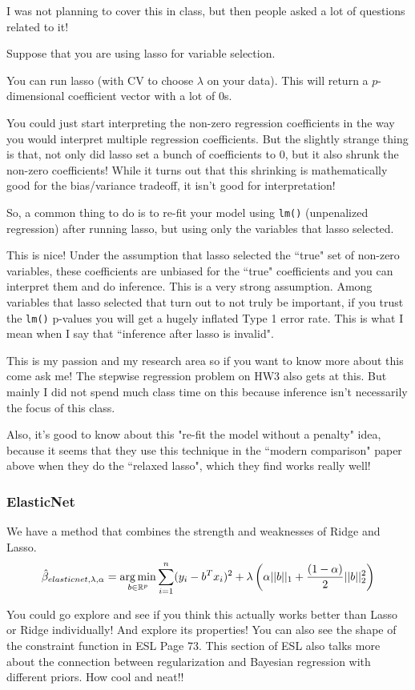 I was not planning to cover this in class, but then people asked a lot of questions related to it!

Suppose that you are using lasso for variable selection. 

You can run lasso (with CV to choose $\lambda$ on your data). This will return a $p$-dimensional coefficient vector with a lot of $0$s. 

You could just start interpreting the non-zero regression coefficients in the way you would interpret multiple regression coefficients. But the slightly strange thing is that, not only did lasso set a bunch of coefficients to $0$, but it also shrunk the non-zero coefficients! While it turns out that this shrinking is mathematically good for the bias/variance tradeoff, it isn't good for interpretation! 

So, a common thing to do is to re-fit your model using \texttt{lm()} (unpenalized regression) after running lasso, but using only the variables that lasso selected.

This is nice! Under the assumption that lasso selected the ``true" set of non-zero variables, these coefficients are unbiased for the ``true" coefficients and you can interpret them and do inference. This is a very strong assumption. Among variables that lasso selected that turn out to not truly be important, if you trust the \texttt{lm()} p-values you will get a hugely inflated Type 1 error rate. This is what I mean when I say that ``inference after lasso is invalid".

This is my passion and my research area so if you want to know more about this come ask me! The stepwise regression problem on HW3 also gets at this. But mainly I did not spend much class time on this because inference isn't necessarily the focus of this class. 

Also, it's good to know about this "re-fit the model without a penalty" idea, because it seems that they use this technique in the ``modern comparison" paper above when they do the ``relaxed lasso", which they find works really well! 
\subsubsection{ElasticNet}

We have a method that combines the strength and weaknesses of Ridge and Lasso. 
\begin{equation}
\label{subset}
\hat{\beta}_{elasticnet,\lambda, \alpha} = \mathop{\mathrm{arg\,min}}_{b \in \mathbb{R}^p} \sum_{i=1}^n 	(y_i - b^T x_i)^2 + \lambda \left( \alpha ||b||_1 + \frac{(1-\alpha)}{2}||b||^2_2\right) 
\end{equation}

You could go explore and see if you think this actually works better than Lasso or Ridge individually! And explore its properties! You can also see the shape of the constraint function in ESL Page 73. This section of ESL also talks more about the connection between regularization and Bayesian regression with different priors. How cool and neat!! 




